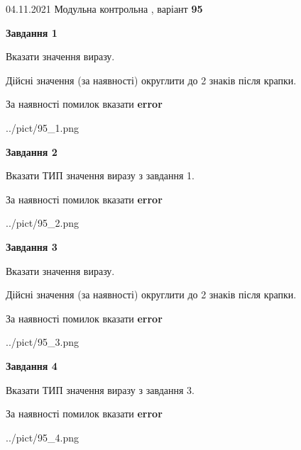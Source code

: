 \documentclass[11pt, ukrainian]{article}
\begin{document}
{04.11.2021 Модульна контрольна , варіант  \No \textbf { 95 }\par}
{
\begin {large}
{\begin {center}\textbf{Завдання 1}\end {center}}\par
Вказати значення виразу. \par
Дійсні значення (за наявності) округлити до 2 знаків після крапки. \par
За наявності помилок вказати \textbf{error}

\begin{center}
	{../pict/95_1.png}
\end{center}
\newpage

{\begin {center}\textbf{Завдання 2}\end {center}}\par
Вказати ТИП значення виразу з завдання 1. \par
За наявності помилок вказати \textbf{error}

\begin{center}
	{../pict/95_2.png}
\end{center}
\newpage

{\begin {center}\textbf{Завдання 3}\end {center}}\par
Вказати значення виразу. \par
Дійсні значення (за наявності) округлити до 2 знаків після крапки. \par
За наявності помилок вказати \textbf{error}

\begin{center}
	{../pict/95_3.png}
\end{center}
\newpage

{\begin {center}\textbf{Завдання 4}\end {center}}\par
Вказати ТИП значення виразу з завдання 3. \par
За наявності помилок вказати \textbf{error}

\begin{center}
	{../pict/95_4.png}
\end{center}
\newpage


\end{large}}
\end{document}
